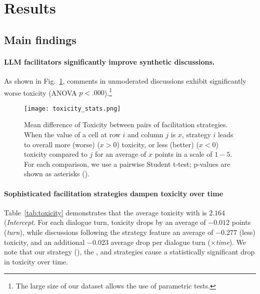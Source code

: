 %

\section{Results}
\label{sec:results}


\subsection{Main findings}

\paragraph{\ac{LLM} facilitators significantly improve synthetic discussions.} As shown in Fig.~\ref{fig:toxicity_stats}, comments in unmoderated discussions exhibit significantly worse toxicity (ANOVA $p<.000$).\footnote{The large size of our dataset allows the use of parametric tests.} 

\begin{figure}
	\texttt{[image: toxicity\_stats.png]}
	\centering
	\caption{Mean difference of Toxicity between pairs of facilitation strategies. When the value of a cell at row $i$ and column $j$ is $x$, strategy $i$ leads to overall more (worse) ($x>0$) toxicity, or less (better) ($x<0$) toxicity compared to $j$ for an average of $x$ points in a scale of $1-5$. For each comparison, we use a pairwise Student t-test; p-values are shown as asterisks (\asterisknote).}
	\label{fig:toxicity_stats}
\end{figure}

\paragraph{Sophisticated facilitation strategies dampen toxicity over time} Table~\ref{tab:toxicity} demonstrates that the average toxicity with \emph{\strategynomod} is $2.164$ (\textit{Intercept}. For each dialogue turn, toxicity drops by an average of $-0.012$ points (\textit{turn}), while discussions following the \emph{\strategyregroom} strategy feature an average of  $-0.277$ (less) toxicity, and an additional $-0.023$ average drop per dialogue turn (\emph{\strategyregroom}$\times$\textit{time}). We note that our strategy (\emph{\strategymodgame}), the \emph{\strategyregroom}, and \emph{\strategyconstrcomm} strategies cause a statistically significant drop in toxicity over time.

